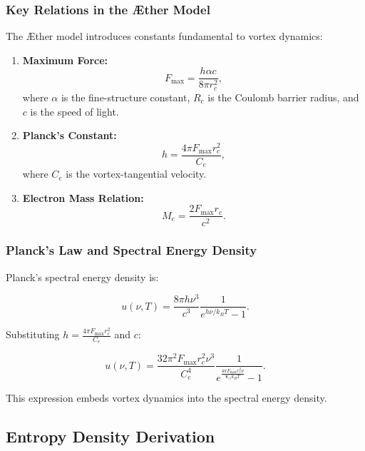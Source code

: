 \documentclass[a4paper,10pt]{article}
\begin{document}
  \subsubsection*{Key Relations in the Æther Model}
  The Æther model introduces constants fundamental to vortex dynamics:

  \begin{enumerate}
   \item \textbf{Maximum Force:}
   \begin{equation*}
    F_{\max} = \frac{h \alpha c}{8 \pi r_c^2},
   \end{equation*}
   where $\alpha$ is the fine-structure constant, $R_c$ is the Coulomb barrier radius, and $c$ is the speed of light.

   \item \textbf{Planck's Constant:}
   \begin{equation*}
    h = \frac{4 \pi F_{\max} r_c^2}{C_e},
   \end{equation*}
   where $C_e$ is the vortex-tangential velocity.

   \item \textbf{Electron Mass Relation:}
   \begin{equation*}
    M_e = \frac{2 F_{\max} r_c}{c^2}.
   \end{equation*}
  \end{enumerate}

  \subsubsection*{Planck's Law and Spectral Energy Density}
  Planck's spectral energy density is:

  \begin{equation*}
   u(\nu, T) = \frac{8 \pi h \nu^3}{c^3} \frac{1}{e^{h \nu / k_B T} - 1}.
  \end{equation*}

  Substituting $h = \frac{4 \pi F_{\max} r_c^2}{C_e}$ and $c$:

  \begin{equation*}
   u(\nu, T) = \frac{32 \pi^2 F_{\max} r_c^2 \nu^3}{C_e^4} \frac{1}{e^{\frac{4 \pi F_{\max} r_c^2 \nu}{\mathbf{v}_{\scriptscriptstyle\boldsymbol{\circlearrowleft}} k_B T}} - 1}.
  \end{equation*}

  This expression embeds vortex dynamics into the spectral energy density.

  \subsection*{Entropy Density Derivation}
\end{document}
